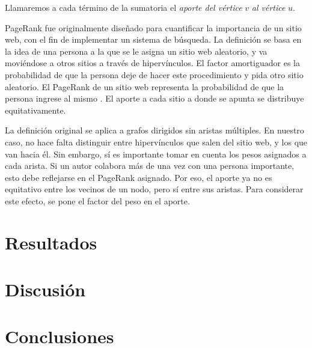 \documentclass[journal]{IEEEtran}
\begin{document}
Llamaremos a cada término de la sumatoria el \textit{aporte del vértice} \(v\) \textit{al vértice} \(u\).

PageRank fue originalmente diseñado para cuantificar la importancia de un sitio web, con el fin de implementar un sistema de búsqueda. La definición se basa en la idea de una persona a la que se le asigna un sitio web aleatorio, y va moviéndose a otros sitios a través de hipervínculos. El factor amortiguador es la probabilidad de que la persona deje de hacer este procedimiento y pida otro sitio aleatorio. El PageRank de un sitio web representa la probabilidad de que la persona ingrese al mismo \cite{google}. El aporte a cada sitio a donde se apunta se distribuye equitativamente.

La definición original se aplica a grafos dirigidos sin aristas múltiples. En nuestro caso, no hace falta distinguir entre hipervínculos que salen del sitio web, y los que van hacia él. Sin embargo, sí es importante tomar en cuenta los pesos asignados a cada arista. Si un autor colabora más de una vez con una persona importante, esto debe reflejarse en el PageRank asignado. Por eso, el aporte ya no es equitativo entre los vecinos de un nodo, pero sí entre sus aristas. Para considerar este efecto, se pone el factor del peso en el aporte.

\section{Resultados}

\section{Discusión}

\section{Conclusiones}

\ifCLASSOPTIONcaptionsoff
  \newpage
\fi

\end{document}
